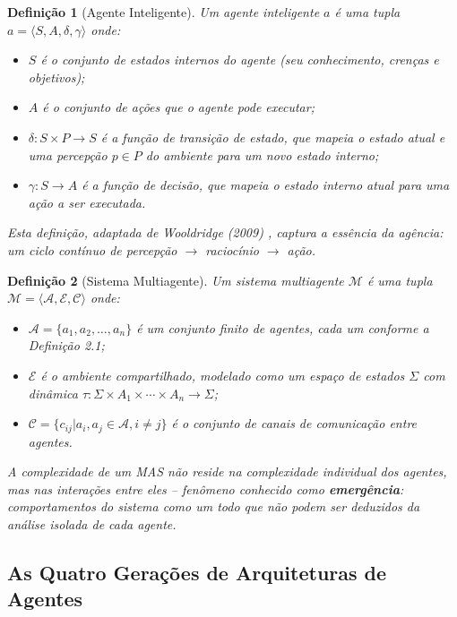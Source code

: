 \documentclass[12pt,a4paper,sumario=tradicional,openany]{abntex2}
\newtheorem{definition}{Definição}[chapter]
\begin{document}
\begin{definition}[Agente Inteligente]
Um agente inteligente $a$ é uma tupla $a = \langle S, A, \delta, \gamma \rangle$ onde:
\begin{itemize}
    \item $S$ é o conjunto de estados internos do agente (seu conhecimento, crenças e objetivos);
    \item $A$ é o conjunto de ações que o agente pode executar;
    \item $\delta: S \times P \rightarrow S$ é a função de transição de estado, que mapeia o estado atual e uma percepção $p \in P$ do ambiente para um novo estado interno;
    \item $\gamma: S \rightarrow A$ é a função de decisão, que mapeia o estado interno atual para uma ação a ser executada.
\end{itemize}
Esta definição, adaptada de Wooldridge (2009) \cite{wooldridge2009mas}, captura a essência da agência: um ciclo contínuo de percepção $\rightarrow$ raciocínio $\rightarrow$ ação.
\end{definition}

\begin{definition}[Sistema Multiagente]
Um sistema multiagente $\mathcal{M}$ é uma tupla $\mathcal{M} = \langle \mathcal{A}, \mathcal{E}, \mathcal{C} \rangle$ onde:
\begin{itemize}
    \item $\mathcal{A} = \{a_1, a_2, \ldots, a_n\}$ é um conjunto finito de agentes, cada um conforme a Definição 2.1;
    \item $\mathcal{E}$ é o ambiente compartilhado, modelado como um espaço de estados $\Sigma$ com dinâmica $\tau: \Sigma \times A_1 \times \cdots \times A_n \rightarrow \Sigma$;
    \item $\mathcal{C} = \{c_{ij} | a_i, a_j \in \mathcal{A}, i \neq j\}$ é o conjunto de canais de comunicação entre agentes.
\end{itemize}
A complexidade de um MAS não reside na complexidade individual dos agentes, mas nas interações entre eles -- fenômeno conhecido como \textbf{emergência}: comportamentos do sistema como um todo que não podem ser deduzidos da análise isolada de cada agente.
\end{definition}

\subsection{As Quatro Gerações de Arquiteturas de Agentes}
\end{document}
